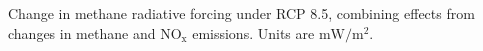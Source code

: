 Change in methane radiative forcing under RCP 8.5, combining effects from changes in methane and $\mathrm{NO_x}$ emissions. Units are $\mathrm{mW/m^2}$.~\label{fig:drfcomb85}